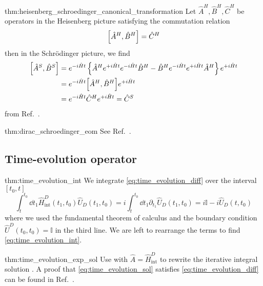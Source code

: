 \begin{delayedproof}{thm:heisenberg_schroedinger_canonical_transformation}
	Let $\hat{A}^H,\hat{B}^H,\hat{C}^H$ be operators in the Heisenberg picture satisfying the commutation relation
	\begin{equation}
		\comm{\hat{A}^H}{\hat{B}^H}
		=
		\hat{C}^H
	\end{equation}
	then in the Schrödinger picture, we find
	\begin{equation}
		\begin{split}
			\comm{\hat{A}^S}{\hat{B}^S}
			&=
			e^{-i\hat{H}t}
			\left\{
				\hat{A}^H
				e^{+i\hat{H}t}
				e^{-i\hat{H}t}
				\hat{B}^H
				-	
				\hat{B}^H
				e^{-i\hat{H}t}
				e^{+i\hat{H}t}
				\hat{A}^H
			\right\}
			e^{+i\hat{H}t}
			\\
			&=
			e^{-i\hat{H}t}
			\comm{\hat{A}^H}{\hat{B}^H}
			e^{+i\hat{H}t}
			\\
			&=
			e^{-i\hat{H}t}
			\hat{C}^H
			e^{+i\hat{H}t}
			=
			\hat{C}^S
		\end{split}
	\end{equation}
	from Ref.~\cite[p.~213]{Greiner2013}.
\end{delayedproof}

\begin{delayedproof}{thm:dirac_schroedinger_eom}
	See Ref.~\cite[p.~214]{Greiner2013}.
\end{delayedproof}

\subsection{Time-evolution operator}

\begin{delayedproof}{thm:time_evolution_int}
	We integrate \cref{eq:time_evolution_diff} over the interval $[t_0,t]$
	\begin{equation}
		\int_t^{t_0}\dd{t_1}
		\hat{H}_\text{int}^D(t_1,t_0)
		\hat{U}_D(t_1,t_0)
		=
		i\int_t^{t_0}\dd{t_1}
		\partial_{t_1}
		\hat{U}_D(t_1,t_0)
		=
		i\mathbb{I}
		-
		i\hat{U}_D(t,t_0)
	\end{equation}
	where we used the fundamental theorem of calculus and the boundary condition $\hat{U}^D(t_0,t_0)=\mathbb{I}$ in the third line.
	We are left to rearrange the terms to find \cref{eq:time_evolution_int}.
\end{delayedproof}

\begin{delayedproof}{thm:time_evolution_exp_sol}
	Use  with $\hat{A}=\hat{H}_\text{int}^D$ to rewrite the iterative integral solution .
	A proof that \cref{eq:time_evolution_sol} satisfies \cref{eq:time_evolution_diff} can be found in Ref.~\cite[p.~219]{Greiner2013}.
\end{delayedproof}

